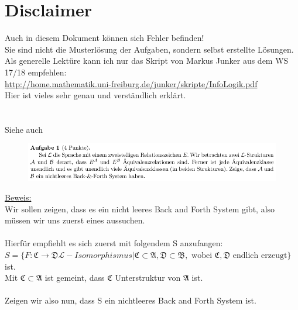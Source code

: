 \documentclass[a4paper]{scrartcl}
\begin{document}
\section*{Disclaimer}%
\label{sec:disclaimer}
Auch in diesem Dokument können sich Fehler befinden!\\
Sie sind nicht die Musterlösung der Aufgaben, sondern selbst erstellte Lösungen.\\

Als generelle Lektüre kann ich nur das Skript von Markus Junker aus dem WS 17/18 empfehlen:\\
\url{http://home.mathematik.uni-freiburg.de/junker/skripte/InfoLogik.pdf}\\
Hier ist vieles sehr genau und verständlich erklärt.

\section*{}%
\label{sec:aufgabe_1}

    Siehe auch 

    \begin{figure}[H]
        \centering
        \includegraphics[scale=0.6]{./A-1.png}
        \label{fig:}
    \end{figure} 

    \underline{Beweis:}\\
    Wir sollen zeigen, dass es ein nicht leeres Back and Forth System gibt, also müssen wir uns zuerst eines aussuchen.\\
    \\Hierfür empfiehlt es sich zuerst mit folgendem S anzufangen:\\
    $S = \{F: \mathfrak{C} \rightarrow \mathfrak{D} \mathscr{L}-Isomorphismus| \mathfrak{C} \subset \mathfrak{A}, \mathfrak{D} \subset \mathfrak{B},
    \text{ wobei  }\mathfrak{C}, \mathfrak{D} \text{ endlich erzeugt}\}$ ist.\\
    Mit $\mathfrak{C} \subset \mathfrak{A}$ ist gemeint, dass $\mathfrak{C}$ Unterstruktur von $\mathfrak{A}$ ist.\\

    \\Zeigen wir also nun, dass S ein nichtleeres Back and Forth System ist. 
\end{document}
